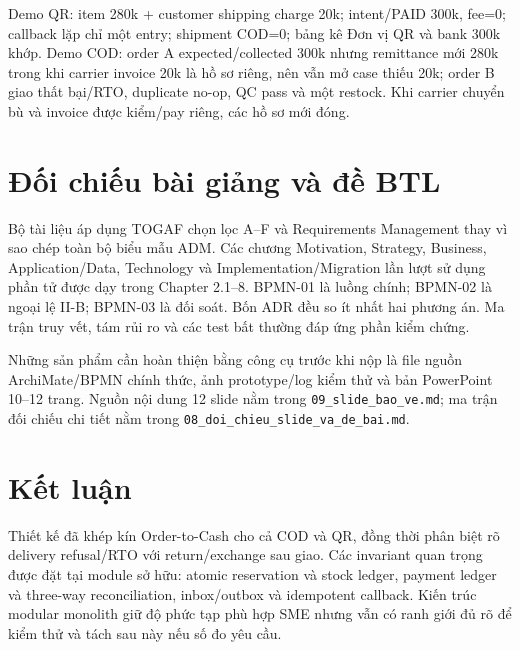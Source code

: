 \documentclass[12pt,a4paper]{report}
\newcommand{\code}[1]{\texttt{#1}}
\begin{document}
Demo QR: item 280k + customer shipping charge 20k; intent/PAID 300k, fee=0; callback lặp chỉ một entry; shipment COD=0; bảng kê Đơn vị QR và bank 300k khớp. Demo COD: order A expected/collected 300k nhưng remittance mới 280k trong khi carrier invoice 20k là hồ sơ riêng, nên vẫn mở case thiếu 20k; order B giao thất bại/RTO, duplicate no-op, QC pass và một restock. Khi carrier chuyển bù và invoice được kiểm/pay riêng, các hồ sơ mới đóng.

\chapter{Đối chiếu bài giảng và đề BTL}

Bộ tài liệu áp dụng TOGAF chọn lọc A--F và Requirements Management thay vì sao chép toàn bộ biểu mẫu ADM. Các chương Motivation, Strategy, Business, Application/Data, Technology và Implementation/Migration lần lượt sử dụng phần tử được dạy trong Chapter 2.1--8. BPMN-01 là luồng chính; BPMN-02 là ngoại lệ II-B; BPMN-03 là đối soát. Bốn ADR đều so ít nhất hai phương án. Ma trận truy vết, tám rủi ro và các test bất thường đáp ứng phần kiểm chứng.

Những sản phẩm cần hoàn thiện bằng công cụ trước khi nộp là file nguồn ArchiMate/BPMN chính thức, ảnh prototype/log kiểm thử và bản PowerPoint 10--12 trang. Nguồn nội dung 12 slide nằm trong \code{09\_slide\_bao\_ve.md}; ma trận đối chiếu chi tiết nằm trong \code{08\_doi\_chieu\_slide\_va\_de\_bai.md}.

\chapter{Kết luận}
Thiết kế đã khép kín Order-to-Cash cho cả COD và QR, đồng thời phân biệt rõ delivery refusal/RTO với return/exchange sau giao. Các invariant quan trọng được đặt tại module sở hữu: atomic reservation và stock ledger, payment ledger và three-way reconciliation, inbox/outbox và idempotent callback. Kiến trúc modular monolith giữ độ phức tạp phù hợp SME nhưng vẫn có ranh giới đủ rõ để kiểm thử và tách sau này nếu số đo yêu cầu.
\end{document}
